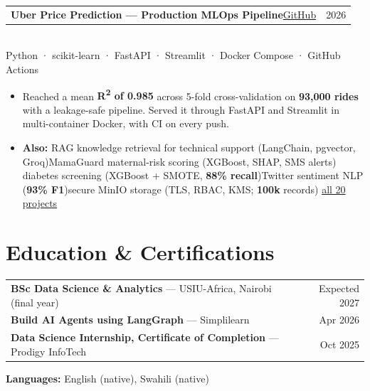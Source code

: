 \documentclass[10pt,a4paper]{article}
\makeatletter
\newcommand{\sep}{\hspace{0.45em}{\color{rule}|}\hspace{0.45em}}
\newcommand{\meta}[1]{{\color{muted}#1}}
\newcommand{\project}[5]{%
  \begin{tabularx}{\linewidth}{@{}X r@{}}
    {\fontsize{10.5}{12.5}\selectfont\bfseries #1}\hspace{0.5em}\href{#3}{\color{accent}\small #2} & \meta{#4} \\
  \end{tabularx}\\[-1pt]
  {\color{muted}\small #5}\par
}
\makeatother
\begin{document}
\vspace{3pt}
\project{Uber Price Prediction — Production MLOps Pipeline}{GitHub}{https://github.com/Calvin-Gacheru/Uber-Price-Prediction}{2026}
  {Python · scikit-learn · FastAPI · Streamlit · Docker Compose · GitHub Actions}
\begin{itemize}
  \item Reached a mean \textbf{R\textsuperscript{2} of 0.985} across 5-fold cross-validation on \textbf{93,000 rides} with a leakage-safe pipeline. Served it through FastAPI and Streamlit in multi-container Docker, with CI on every push.
\end{itemize}

\begin{itemize}
  \item \textbf{Also:} RAG knowledge retrieval for technical support (LangChain, pgvector, Groq)\sep MamaGuard maternal-risk scoring (XGBoost, SHAP, SMS alerts)\sep
  diabetes screening (XGBoost + SMOTE, \textbf{88\% recall})\sep Twitter sentiment NLP (\textbf{93\% F1})\sep secure MinIO storage (TLS, RBAC, KMS; \textbf{100k} records)\sep
  \href{https://calvin-gacheru.github.io/MyPortfolio/projects.html}{\color{accent}all 20 projects}
\end{itemize}

\section{Education \& Certifications}
\begin{tabularx}{\linewidth}{@{}X r@{}}
\textbf{BSc Data Science \& Analytics} — USIU-Africa, Nairobi \meta{(final year)} & \meta{Expected 2027} \\[1pt]
\textbf{Build AI Agents using LangGraph} — Simplilearn & \meta{Apr 2026} \\[1pt]
\textbf{Data Science Internship, Certificate of Completion} — Prodigy InfoTech & \meta{Oct 2025} \\
\end{tabularx}\par
\vspace{4pt}
{\small\textbf{Languages:} English (native), Swahili (native)}
\end{document}
